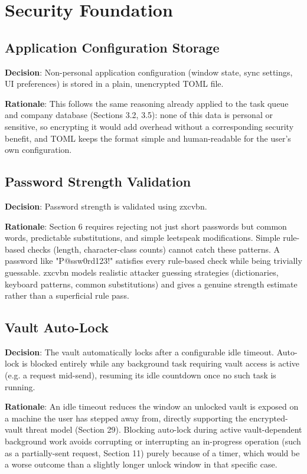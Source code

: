 \chapter{Security Foundation}

\section{Application Configuration Storage}
\textbf{Decision}: Non-personal application configuration (window state, sync settings, UI preferences) is stored in a plain, unencrypted TOML file.

\textbf{Rationale}: This follows the same reasoning already applied to the task queue and company database (Sections 3.2, 3.5): none of this data is personal or sensitive, so encrypting it would add overhead without a corresponding security benefit, and TOML keeps the format simple and human-readable for the user's own configuration.
\section{Password Strength Validation}
\textbf{Decision}: Password strength is validated using zxcvbn.

\textbf{Rationale}: Section 6 requires rejecting not just short passwords but common words, predictable substitutions, and simple leetspeak modifications. Simple rule-based checks (length, character-class counts) cannot catch these patterns. A password like "P@ssw0rd123!" satisfies every rule-based check while being trivially guessable. zxcvbn models realistic attacker guessing strategies (dictionaries, keyboard patterns, common substitutions) and gives a genuine strength estimate rather than a superficial rule pass.
\section{Vault Auto-Lock}
\textbf{Decision}: The vault automatically locks after a configurable idle timeout. Auto-lock is blocked entirely while any background task requiring vault access is active (e.g. a request mid-send), resuming its idle countdown once no such task is running.

\textbf{Rationale}: An idle timeout reduces the window an unlocked vault is exposed on a machine the user has stepped away from, directly supporting the encrypted-vault threat model (Section 29). Blocking auto-lock during active vault-dependent background work avoids corrupting or interrupting an in-progress operation (such as a partially-sent request, Section 11) purely because of a timer, which would be a worse outcome than a slightly longer unlock window in that specific case.

